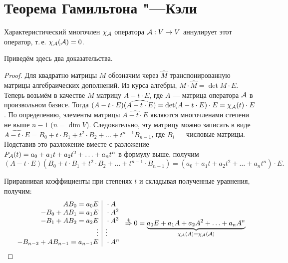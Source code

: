 \section{Теорема Гамильтона "---Кэли}

\begin{theorem}
    Характеристический многочлен $\chi_{\mathcal{A}}$ оператора $\mathcal{A}: V \to V$ аннулирует этот оператор, т.\,е. $\chi_{\mathcal{A}}(\mathcal{A}) = 0$.
\end{theorem}

Приведём здесь два доказательства.

\begin{proof}
    Для квадратно матрицы $M$ обозначим через $\widehat{M}$ транспонированную матрицы алгебраических дополнений. Из курса алгебры, $M \cdot \widehat{M} = \det M \cdot E$. Теперь возьмём в качестве $M$ матрицу $A - t \cdot E$, где $A$ --- матрица оператора $\mathcal{A}$ в произвольном базисе. Тогда $(A - t \cdot E)(\widehat{A - t \cdot E}) = \det (A - t \cdot E) \cdot E = \chi_{\mathcal{A}}(t) \cdot E$. По определению, элементы матрицы $\widehat{A - t \cdot E}$ являются многочленами степени не выше $n - 1$ ($n = \dim V$). Следовательно, эту матрицу можно записать в виде $\widehat{A - t \cdot E} = B_0 + t \cdot B_1 + t^2 \cdot B_2 + \ldots + t^{n - 1}B_{n - 1}$, где $B_i$ --- числовые матрицы. Подставив это разложение вместе с разложение $P_{\mathcal{A}}(t) = a_0 + a_1t + a_2t^2 + \ldots + a_nt^n$ в формулу выше, получим
\[
    (A - t \cdot E)(B_0 + t \cdot B_1 + t^2 \cdot B_2 + \ldots + t^{n - 1} \cdot B_{n - 1}) = (a_0 + a_1t + a_2t^2 + \ldots + a_nt^n) \cdot E.
\]

Приравнивая коэффициенты при степенях $t$ и складывая полученные уравнения, получим:
\[
    \begin{array}{r | l}
        AB_0 = a_0E & {} \cdot A\\
        -B_0 + AB_1 = a_1E & {} \cdot A^2\\
        -B_1 + AB_2 = a_2E & {} \cdot A^3\\
        \vdots & \vdots\\
        -B_{n - 2} + AB_{n - 1} = a_{n - 1}E & {} \cdot A^n\\
    \end{array} \overset{+}{\Rightarrow} 0 = \underbrace{a_0E + a_1A + a_2A^2 + \ldots + a_nA^n}_{\chi_{\mathcal{A}}(A) = \chi_{\mathcal{A}}(\mathcal{A})}
\]
\end{proof}

